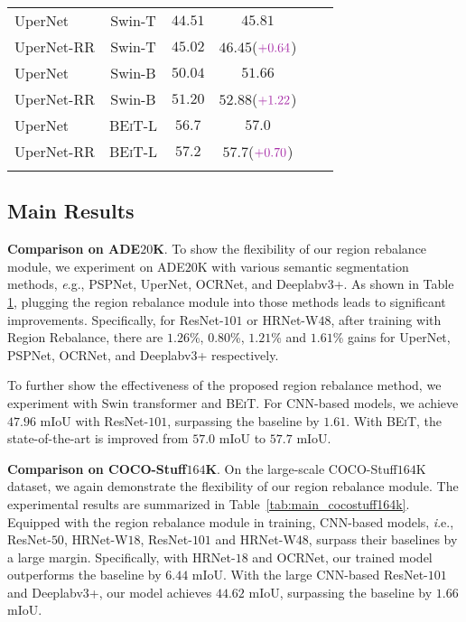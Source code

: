 \documentclass[final]{cvpr}
\begin{document}
\begin{table}[t]
{\begin{tabular}{l|ccccc}
			\shline
			UperNet       &Swin-T       &$44.51$ &$45.81$ \\
			UperNet-RR    &Swin-T       &$45.02$ &$46.45$($\textcolor{mylight}{+0.64}$) \\
			UperNet       &Swin-B\dag   &$50.04$ &$51.66$ \\
			UperNet-RR    &Swin-B\dag   &$51.20$ &$52.88$($\textcolor{mylight}{+1.22}$) \\
			\shline
			UperNet       &\textsc{BEiT}-L &$56.7$ &$57.0$ \\
			UperNet-RR    &\textsc{BEiT}-L &$57.2$ &$57.7$($\textcolor{mylight}{+0.70}$) \\
			\shline
		\end{tabular}
	}
	\label{tab:main_ade20k}
	\vspace{-0.2in}
\end{table}

\subsection{Main Results}

\vspace{1mm}
\noindent\textbf{Comparison on ADE$20$K}.
To show the flexibility of our region rebalance module, we experiment on ADE$20$K with various semantic segmentation methods, {\textit e.g.}, PSPNet, UperNet, OCRNet, and Deeplabv3+. As shown in Table \ref{tab:main_ade20k}, plugging the region rebalance module into those methods leads to significant improvements. Specifically, for ResNet-$101$ or HRNet-W$48$, after training with Region Rebalance, there are $1.26$\%, $0.80$\%, $1.21$\% and $1.61$\% gains for UperNet, PSPNet, OCRNet, and Deeplabv3+ respectively.


To further show the effectiveness of the proposed region rebalance method, we experiment with Swin transformer and \textsc{BEiT}. For CNN-based models, we achieve $47.96$ $\mathrm{mIoU}$ with ResNet-$101$, surpassing the baseline by $1.61$. With \textsc{BEiT}, the state-of-the-art is improved from $57.0$ $\mathrm{mIoU}$ to $57.7$ $\mathrm{mIoU}$.

\vspace{1mm}
\noindent\textbf{Comparison on COCO-Stuff$164$K}.
On the large-scale COCO-Stuff$164$K dataset, we again demonstrate the flexibility of our region rebalance module. The experimental results are summarized in Table~\ref{tab:main_cocostuff164k}.
Equipped with the region rebalance module in training, CNN-based models, {\textit i.e.}, ResNet-$50$, HRNet-W$18$, ResNet-$101$ and HRNet-W$48$, surpass their baselines by a large margin. Specifically, with HRNet-$18$ and OCRNet, our trained model outperforms the baseline by $6.44$ $\mathrm{mIoU}$. With the large CNN-based ResNet-$101$ and Deeplabv3+, our model achieves $44.62$ $\mathrm{mIoU}$, surpassing the baseline by $1.66$ $\mathrm{mIoU}$. 
\end{document}

